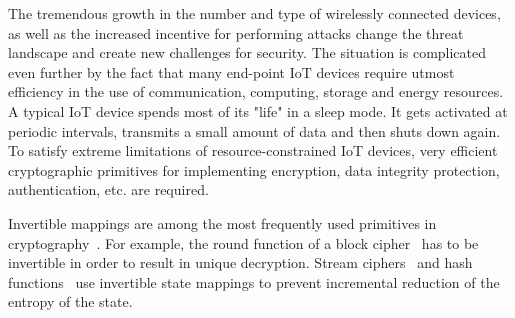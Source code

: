 \documentclass[9pt,conference]{IEEEtran} \usepackage{times}
\begin{document}
The tremendous growth in the number and type of wirelessly connected devices, as well as the increased incentive for performing attacks change the threat landscape and create new challenges for security. 
The situation is complicated even further by the fact that many 
end-point IoT devices require utmost efficiency in the use of communication, computing, storage and energy resources. 
A typical IoT device spends most of its "life" in a sleep mode. It gets activated at periodic intervals, transmits a small amount of data and then shuts down again. To satisfy extreme limitations 
of resource-constrained IoT devices, very efficient cryptographic primitives for implementing encryption, data integrity protection, authentication, etc. are required. 

Invertible mappings are among the most frequently used primitives in cryptography~\cite{St06}.
For example, the round function of a block cipher~\cite{pres07,pri12} has to be invertible in order
to result in unique decryption. Stream ciphers~\cite{hell-grain,DuH14} and hash functions~\cite{Quark,DuNS15} use invertible 
state mappings to prevent incremental reduction of the entropy of the state.  
\end{document}
